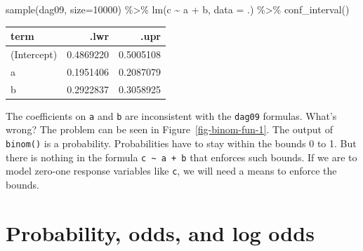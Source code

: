 \documentclass[
  letterpaper,
  DIV=11,
  numbers=noendperiod,
  oneside]{scrreprt}
\newenvironment{Shaded}{\begin{snugshade}}{\end{snugshade}}
\newcommand{\AttributeTok}[1]{\textcolor[rgb]{0.40,0.45,0.13}{#1}}
\newcommand{\DecValTok}[1]{\textcolor[rgb]{0.68,0.00,0.00}{#1}}
\newcommand{\FunctionTok}[1]{\textcolor[rgb]{0.28,0.35,0.67}{#1}}
\newcommand{\NormalTok}[1]{\textcolor[rgb]{0.00,0.23,0.31}{#1}}
\newcommand{\SpecialCharTok}[1]{\textcolor[rgb]{0.37,0.37,0.37}{#1}}
\begin{document}
{\begin{footnotesize}
\begin{Shaded}
\begin{Highlighting}[]
\FunctionTok{sample}\NormalTok{(dag09, }\AttributeTok{size=}\DecValTok{10000}\NormalTok{) }\SpecialCharTok{\%\textgreater{}\%} 
  \FunctionTok{lm}\NormalTok{(c }\SpecialCharTok{\textasciitilde{}}\NormalTok{ a }\SpecialCharTok{+}\NormalTok{ b, }\AttributeTok{data =}\NormalTok{ .) }\SpecialCharTok{\%\textgreater{}\%}
  \FunctionTok{conf\_interval}\NormalTok{()}
\end{Highlighting}
\end{Shaded}

\ttfamily 
\begin{tabular}{lrr}
\toprule
term & .lwr & .upr\\
\midrule
(Intercept) & 0.4869220 & 0.5005108\\
a & 0.1951406 & 0.2087079\\
b & 0.2922837 & 0.3058925\\
\bottomrule
\end{tabular} \normalfont
\bigskip

The coefficients on \texttt{a} and \texttt{b} are inconsistent with the
\texttt{dag09} formulas. What's wrong? The problem can be seen in
Figure~\ref{fig-binom-fun-1}. The output of \texttt{binom()} is a
probability. Probabilities have to stay within the bounds 0 to 1. But
there is nothing in the formula \texttt{c\ \textasciitilde{}\ a\ +\ b}
that enforces such bounds. If we are to model zero-one response
variables like \texttt{c}, we will need a means to enforce the bounds.

\hypertarget{probability-odds-and-log-odds}{%
\section{Probability, odds, and log
odds}\label{probability-odds-and-log-odds}}

\begin{tcolorbox}[enhanced jigsaw, colbacktitle=quarto-callout-warning-color!10!white, breakable, opacitybacktitle=0.6, colback=white, left=2mm, arc=.35mm, colframe=quarto-callout-warning-color-frame, coltitle=black, toprule=.15mm, opacityback=0, leftrule=.75mm, bottomtitle=1mm, toptitle=1mm, titlerule=0mm, title=\textcolor{quarto-callout-warning-color}{\faExclamationTriangle}\hspace{0.5em}{Under construction}, rightrule=.15mm, bottomrule=.15mm]

\end{tcolorbox}


\end{footnotesize}}
\end{document}
